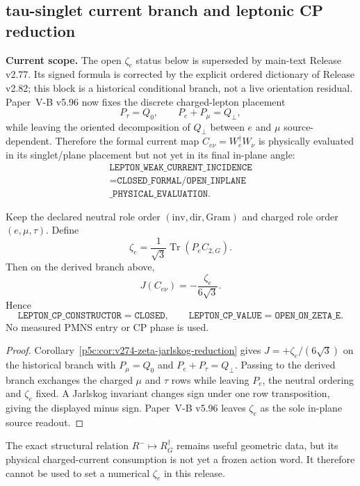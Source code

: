 \documentclass[12pt,a4paper]{article}
\begin{document}
\subsection{tau-singlet current branch and leptonic CP reduction}
\label{p5c:sec:v276-tau-singlet-lepton-cp}
\noindent\textbf{Current scope.} The open $\zeta_e$ status below is superseded by main-text Release v2.77.  Its signed formula is corrected by the explicit ordered dictionary of Release v2.82; this block is a historical conditional branch, not a live orientation residual.
Paper~V-B v5.96 now fixes the discrete charged-lepton placement
\[
 \boxed{P_\tau=Q_0,\qquad P_e+P_\mu=Q_\perp,}
\]
while leaving the oriented decomposition of $Q_\perp$ between $e$ and $\mu$
source-dependent.  Therefore the formal current map
$C_{e\nu}=W_e^\dagger W_\nu$ is physically evaluated in its singlet/plane
placement but not yet in its final in-plane angle:
\[
 \boxed{\begin{gathered}
 \texttt{LEPTON\_WEAK\_CURRENT\_INCIDENCE}\\
 =\texttt{CLOSED\_FORMAL/OPEN\_INPLANE}\\
 \texttt{\_PHYSICAL\_EVALUATION}.
 \end{gathered}}
\]

\begin{corollary}
\label{p5c:cor:v276-tau-singlet-zeta-jarlskog}
Keep the declared neutral role order $(\mathrm{inv},\mathrm{dir},\mathrm{Gram})$
and charged role order $(e,\mu,\tau)$.  Define
\[
 \zeta_e=\frac1{\sqrt3}\operatorname{Tr}(P_eC_{2,G}).
\]
Then on the derived branch above,
\[
 \boxed{J(C_{e\nu})=-\frac{\zeta_e}{6\sqrt3}.}
\]
Hence
\[
 \boxed{
 \texttt{LEPTON\_CP\_CONSTRUCTOR}=\texttt{CLOSED},\qquad
 \texttt{LEPTON\_CP\_VALUE}=\texttt{OPEN\_ON\_ZETA\_E}.}
\]
No measured PMNS entry or CP phase is used.
\end{corollary}
\begin{proof}
Corollary~\ref{p5c:cor:v274-zeta-jarlskog-reduction} gives
$J=+\zeta_e/(6\sqrt3)$ on the historical branch with $P_\mu=Q_0$ and
$P_e+P_\tau=Q_\perp$.  Passing to the derived branch exchanges the charged
$\mu$ and $\tau$ rows while leaving $P_e$, the neutral ordering and
$\zeta_e$ fixed.  A Jarlskog invariant changes sign under one row
transposition, giving the displayed minus sign.  Paper~V-B v5.96 leaves
$\zeta_e$ as the sole in-plane source readout.
\end{proof}

\begin{remark}
The exact structural relation $R^-\mapsto R_G^\dagger$ remains useful
geometric data, but its physical charged-current consumption is not yet a
frozen action word.  It therefore cannot be used to set a numerical
$\zeta_e$ in this release.
\end{remark}
\end{document}
